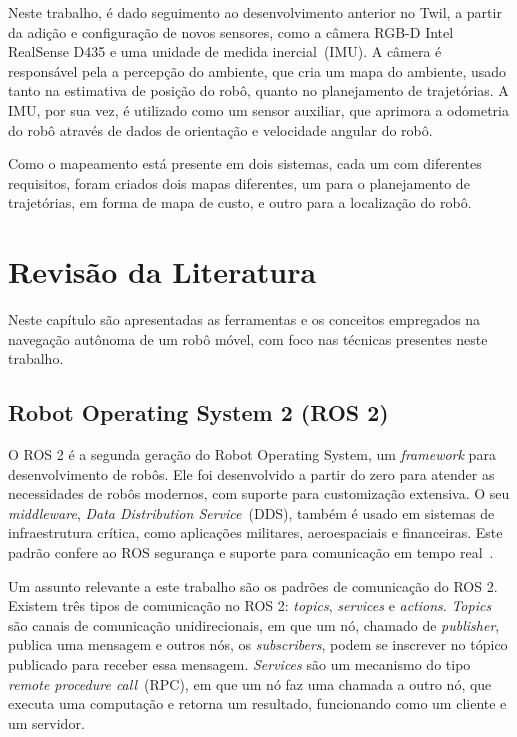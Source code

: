 \documentclass[repeatfields,xlists,xpacks,oneside,yearsonly]{ufrgscca}
\begin{document}
Neste trabalho, é dado seguimento ao desenvolvimento anterior no
Twil, a partir da adição e configuração de novos sensores, como a
câmera RGB-D Intel RealSense D435 e uma unidade de medida
inercial~(IMU). A câmera é responsável pela a percepção do ambiente,
que cria um mapa do ambiente, usado tanto na estimativa de posição do
robô, quanto no planejamento de trajetórias. A IMU, por sua vez, é
utilizado como um sensor auxiliar, que aprimora a odometria do robô
através de dados de orientação e velocidade angular do robô.

Como o mapeamento está presente em dois sistemas, cada um com
diferentes requisitos, foram criados dois mapas diferentes, um para o
planejamento de trajetórias, em forma de mapa de custo, e outro para
a localização do robô.

\chapter{Revisão da Literatura}
\label{revisao}

Neste capítulo são apresentadas as ferramentas e os conceitos
empregados na navegação autônoma de um robô móvel, com foco nas
técnicas presentes neste trabalho.

\section{Robot Operating System 2 (ROS 2)}

O ROS 2 é a segunda geração do Robot Operating System, um
\textit{framework} para desenvolvimento de robôs. Ele foi
desenvolvido a partir do zero para atender as necessidades de robôs
modernos, com suporte para customização extensiva. O seu
\textit{middleware}, \textit{Data Distribution Service}~(DDS), também
é usado em sistemas de infraestrutura crítica, como aplicações
militares, aeroespaciais e financeiras. Este padrão confere ao ROS
segurança e suporte para comunicação em tempo
real~\cite{ROS2Article}.

Um assunto relevante a este trabalho são os padrões de comunicação do
ROS 2. Existem três tipos de comunicação no ROS 2: \textit{topics},
\textit{services} e \textit{actions}. \textit{Topics} são canais de
comunicação unidirecionais, em que um nó, chamado de
\textit{publisher}, publica uma mensagem e outros nós, os
\textit{subscribers}, podem se inscrever no tópico publicado para
receber essa mensagem. \textit{Services} são um mecanismo do tipo
\textit{remote procedure call}~(RPC), em que um nó faz uma chamada a
outro nó, que executa uma computação e retorna um resultado,
funcionando como um cliente e um servidor.
\end{document}
